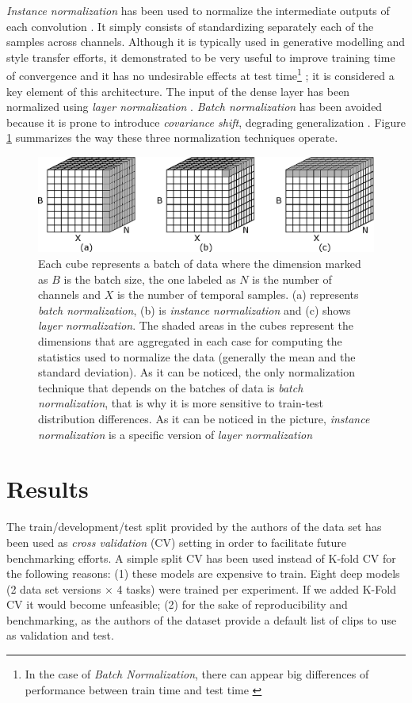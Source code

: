 \documentclass[review]{elsarticle}
\begin{document}
\textit{Instance normalization}  has been used to normalize the intermediate outputs of each convolution \cite{Ulyanov2016, Zheng2018}. It simply consists of standardizing separately each of the samples across channels. Although it is typically used in generative modelling and style transfer efforts, it demonstrated to be very useful to improve training time of convergence and it has no undesirable effects at test time\footnote{In the case of \textit{Batch Normalization}, there can appear big differences of performance between train time and test time \cite{Ba2016}} \cite{Ulyanov2016}; it is considered a key element of this architecture. The input of the dense layer has been normalized using \textit{layer normalization} \cite{Ba2016}. \textit{Batch normalization} \cite{Ioffe2015} has been avoided because it is prone to introduce \textit{covariance shift}, degrading generalization \cite{Ba2016}. Figure \ref{fig:normcubes} summarizes the way these three normalization techniques operate.



\begin{figure}[ht]
	\centering
	\includegraphics[width=0.7\linewidth]{img/normcubes}
	\caption{Each cube represents a batch of data where the dimension marked as $B$ is the batch size, the one labeled as $N$ is the number of channels and $X$ is the number of temporal samples. (a) represents \textit{batch normalization}, (b) is \textit{instance normalization} and (c) shows \textit{layer normalization}. The shaded areas in the cubes represent the dimensions that are aggregated in each case for computing the statistics used to normalize the data (generally the mean and the standard deviation). As it can be noticed, the only normalization technique that depends on the batches of data is \textit{batch normalization}, that is why it is more sensitive to train-test distribution differences. As it can be noticed in the picture, \textit{instance normalization} is a specific version of \textit{layer normalization}}
	\label{fig:normcubes}
\end{figure}




\section{Results} \label{sec:results}
The train/development/test split provided by the authors of the data set \cite{speechcommands} has been used as \textit{cross validation} (CV) setting in order to facilitate future benchmarking efforts. A simple split CV has been used instead of K-fold CV for the following reasons: (1) these models are expensive to train. Eight deep models (2 data set versions $\times$ 4 tasks) were trained per experiment. If we added K-Fold CV it would become unfeasible; (2) for the sake of reproducibility and benchmarking, as the authors of the dataset provide a default list of clips to use as validation and test.
\end{document}
